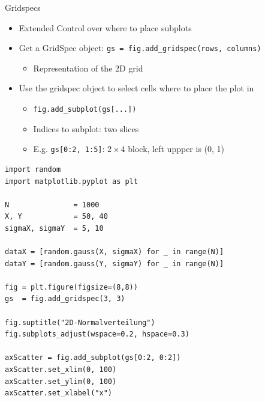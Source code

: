 
\begin{frame}{Gridspecs}
%
\begin{itemize}
\item Extended Control over where to place subplots
\item Get a GridSpec object: \texttt{gs = fig.add\_gridspec(rows, columns)}
	\begin{itemize}
	\item Representation of the 2D grid
	\end{itemize}
\item Use the gridspec object to select cells where to place the plot in
	\begin{itemize}
	\item \texttt{fig.add\_subplot(gs[...])}
	\item Indices to subplot: two slices
	\item E.\;g. \texttt{gs[0:2, 1:5]}: $2 \times 4$ block, left uppper is (0, 1)
	\end{itemize}
\end{itemize}
%
\end{frame}


\begin{frame}[fragile]
%
\begin{codebox}
\begin{verbatim}
import random
import matplotlib.pyplot as plt

N               = 1000
X, Y            = 50, 40
sigmaX, sigmaY  = 5, 10

dataX = [random.gauss(X, sigmaX) for _ in range(N)]
dataY = [random.gauss(Y, sigmaY) for _ in range(N)]

fig = plt.figure(figsize=(8,8))
gs  = fig.add_gridspec(3, 3)

fig.suptitle("2D-Normalverteilung")
fig.subplots_adjust(wspace=0.2, hspace=0.3)

axScatter = fig.add_subplot(gs[0:2, 0:2])
axScatter.set_xlim(0, 100)
axScatter.set_ylim(0, 100)
axScatter.set_xlabel("x")
\end{verbatim}
\end{codebox}
%
\end{frame}


